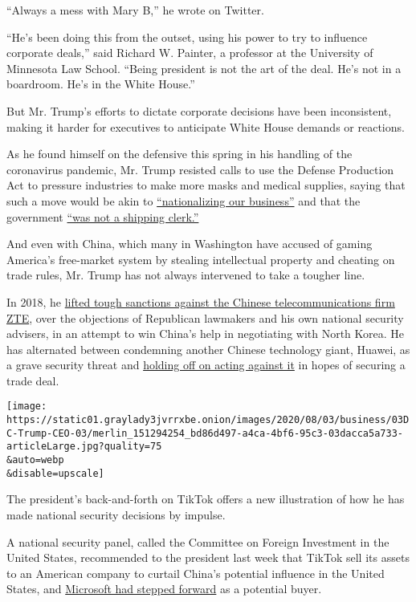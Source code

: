 ``Always a mess with Mary B,'' he wrote on Twitter.

``He's been doing this from the outset, using his power to try to
influence corporate deals,'' said Richard W. Painter, a professor at the
University of Minnesota Law School. ``Being president is not the art of
the deal. He's not in a boardroom. He's in the White House.''

But Mr. Trump's efforts to dictate corporate decisions have been
inconsistent, making it harder for executives to anticipate White House
demands or reactions.

As he found himself on the defensive this spring in his handling of the
coronavirus pandemic, Mr. Trump resisted calls to use the Defense
Production Act to pressure industries to make more masks and medical
supplies, saying that such a move would be akin to
\href{https://www.nytimes3xbfgragh.onion/2020/03/31/us/politics/coronavirus-defense-production-act.html}{``nationalizing
our business''} and that the government
\href{https://www.nytimes3xbfgragh.onion/2020/03/20/us/politics/trump-coronavirus-supplies.html}{``was
not a shipping clerk.''}

And even with China, which many in Washington have accused of gaming
America's free-market system by stealing intellectual property and
cheating on trade rules, Mr. Trump has not always intervened to take a
tougher line.

In 2018, he
\href{https://www.nytimes3xbfgragh.onion/2018/06/07/business/us-china-zte-deal.html}{lifted
tough sanctions against the Chinese telecommunications firm ZTE}, over
the objections of Republican lawmakers and his own national security
advisers, in an attempt to win China's help in negotiating with North
Korea. He has alternated between condemning another Chinese technology
giant, Huawei, as a grave security threat and
\href{https://www.nytimes3xbfgragh.onion/2019/11/15/business/us-reprieve-huawei.html}{holding
off on acting against it} in hopes of securing a trade deal.

\texttt{[image: https://static01.graylady3jvrrxbe.onion/images/2020/08/03/business/03DC-Trump-CEO-03/merlin\_151294254\_bd86d497-a4ca-4bf6-95c3-03dacca5a733-articleLarge.jpg?quality=75\\\&auto=webp\\\&disable=upscale]}

The president's back-and-forth on TikTok offers a new illustration of
how he has made national security decisions by impulse.

A national security panel, called the Committee on Foreign Investment in
the United States, recommended to the president last week that TikTok
sell its assets to an American company to curtail China's potential
influence in the United States, and
\href{https://www.nytimes3xbfgragh.onion/2020/07/31/technology/tiktok-microsoft.html}{Microsoft
had stepped forward} as a potential buyer.

